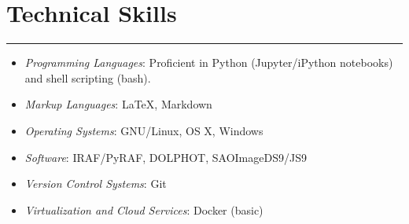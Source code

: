 \documentclass[letterpaper,10pt]{article}
\begin{document}
\section*{Technical Skills}
\hrule
\vspace{.3 cm}
    \begin{multicols}{2}




\begin{itemize}[label=$\blacktriangleright$]
	\item \emph{Programming Languages}: Proficient in Python (Jupyter/iPython notebooks) and shell scripting (bash). 
\end{itemize}

  \begin{itemize}[label=$\blacktriangleright$]
        \item \emph{Markup Languages}: \LaTeX, Markdown
  \end{itemize}

  \begin{itemize}[label=$\blacktriangleright$]
  \item \emph{Operating Systems}: GNU/Linux, OS X, Windows
    \end{itemize}

  \begin{itemize}[label=$\blacktriangleright$]
          \item \emph{Software}: IRAF/PyRAF, DOLPHOT, SAOImageDS9/JS9
    \end{itemize}

  \begin{itemize}[label=$\blacktriangleright$]
          \item \emph{Version Control Systems}: Git
    \end{itemize}
  
    \begin{itemize}[label=$\blacktriangleright$]
            \item \emph{Virtualization and Cloud Services}: Docker (basic)
    \end{itemize}
    
    
        \end{multicols}
\end{document}
